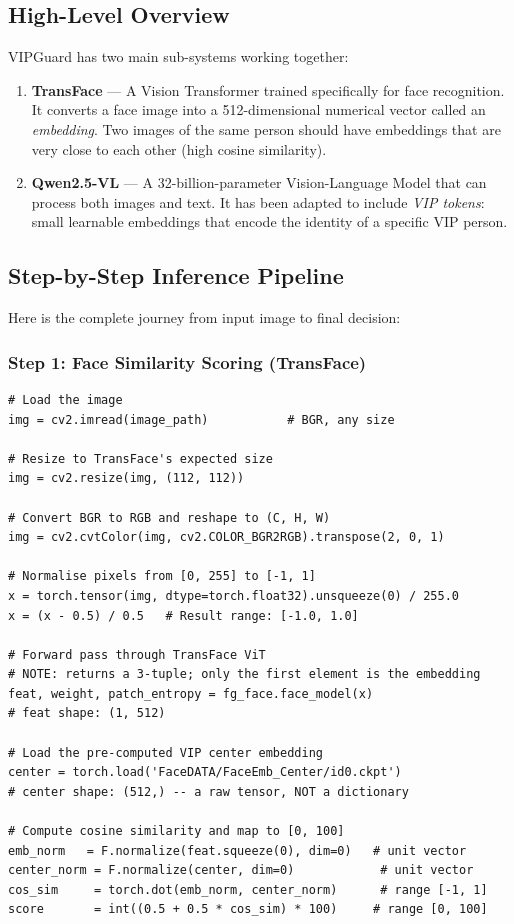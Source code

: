 \documentclass[12pt,a4paper]{article}
\begin{document}
\subsection{High-Level Overview}

VIPGuard has two main sub-systems working together:

\begin{enumerate}
    \item \textbf{TransFace} --- A Vision Transformer trained specifically for face recognition. It converts a face image into a 512-dimensional numerical vector called an \textit{embedding}. Two images of the same person should have embeddings that are very close to each other (high cosine similarity).
    \item \textbf{Qwen2.5-VL} --- A 32-billion-parameter Vision-Language Model that can process both images and text. It has been adapted to include \textit{VIP tokens}: small learnable embeddings that encode the identity of a specific VIP person.
\end{enumerate}

\subsection{Step-by-Step Inference Pipeline}

Here is the complete journey from input image to final decision:

\subsubsection{Step 1: Face Similarity Scoring (TransFace)}

\begin{lstlisting}[caption={Similarity scoring in inference pipeline}]
# Load the image
img = cv2.imread(image_path)           # BGR, any size

# Resize to TransFace's expected size
img = cv2.resize(img, (112, 112))

# Convert BGR to RGB and reshape to (C, H, W)
img = cv2.cvtColor(img, cv2.COLOR_BGR2RGB).transpose(2, 0, 1)

# Normalise pixels from [0, 255] to [-1, 1]
x = torch.tensor(img, dtype=torch.float32).unsqueeze(0) / 255.0
x = (x - 0.5) / 0.5   # Result range: [-1.0, 1.0]

# Forward pass through TransFace ViT
# NOTE: returns a 3-tuple; only the first element is the embedding
feat, weight, patch_entropy = fg_face.face_model(x)
# feat shape: (1, 512)

# Load the pre-computed VIP center embedding
center = torch.load('FaceDATA/FaceEmb_Center/id0.ckpt')
# center shape: (512,) -- a raw tensor, NOT a dictionary

# Compute cosine similarity and map to [0, 100]
emb_norm   = F.normalize(feat.squeeze(0), dim=0)   # unit vector
center_norm = F.normalize(center, dim=0)            # unit vector
cos_sim     = torch.dot(emb_norm, center_norm)      # range [-1, 1]
score       = int((0.5 + 0.5 * cos_sim) * 100)     # range [0, 100]
\end{lstlisting}
\end{document}
